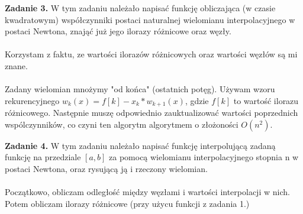 \documentclass[15pt, a4paper]{article}
\begin{document}
\vspace{0.5cm}

\noindent\hrulefill

\vspace{0.5cm}


\noindent\textbf{Zadanie 3.} W tym zadaniu należało napisać funkcję obliczająca (w czasie kwadratowym) współczynniki postaci naturalnej wielomianu interpolacyjnego w postaci Newtona, znająć już jego ilorazy różnicowe oraz węzły.\\\\
Korzystam z faktu, ze wartości ilorazów różnicowych oraz wartości węzłów są mi znane.\\\\
Zadany wielomian mnożymy "od końca" (ostatnich potęg). Używam wzoru rekurencyjnego \(w_k(x) = f[k] - x_k * w_{k+1}(x)\), gdzie \(f[k]\) to wartość ilorazu różnicowego. Następnie muszę odpowiednio zauktualizować wartości poprzednich wspólczynników, co czyni ten algorytm algorytmem o złożoności \(O(n^2)\). 

\vspace{0.5cm}

\noindent\hrulefill

\vspace{0.5cm}


\noindent\textbf{Zadanie 4.} W tym zadaniu należało napisać funkcję interpolującą zadaną funkcję na przedziale \([a, b]\) za pomocą wielomianu interpolacyjnego stopnia n w postaci Newtona, oraz rysującą ją i rzeczony wielomian.\\\\
Początkowo, obliczam odległość między węzłami i wartości interpolacji w nich. Potem obliczam ilorazy różnicowe (przy użycu funkcji z zadania 1.) 
\end{document}
